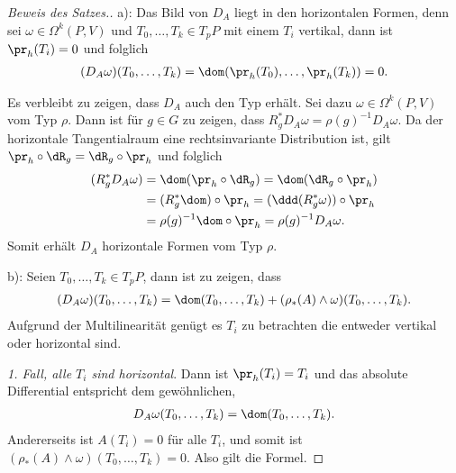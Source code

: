 \documentclass[%
	paper=a5,%
	fleqn,%
	DIV=18,%
	BCOR=0mm,
	fontsize=11pt,
	titlepage=false,%
	bibliography=totoc,
	DIV=18,%
	twoside=true,
	pdftitle=Riemannsche Geometrie,
	pdfauthor=Uwe Semmelmann,
	numbers=noendperiod]%
	{scrbook}
\begin{document}
\begin{proof}[Beweis des Satzes.]
a): Das Bild von $D_A$ liegt in den horizontalen Formen, denn sei
$\omega\in\Omega^k(P,V)$ und $T_0,\ldots,T_k\in T_pP$ mit einem $T_i$ vertikal,
dann ist $\pr_h(T_i) = 0$ und folglich
\begin{align*}
(D_A\omega)(T_0,\ldots,T_k) = \dom(\pr_h(T_0),\ldots,\pr_h(T_k)) = 0.
\end{align*}

Es verbleibt zu zeigen, dass $D_A$ auch den Typ erhält. Sei dazu
$\omega\in\Omega^k(P,V)$ vom Typ $\rho$. Dann ist für $g\in G$ zu
zeigen, dass $R_g^*D_A\omega = \rho(g)^{-1}D_A\omega$. Da der horizontale
Tangentialraum eine rechtsinvariante Distribution ist, gilt $\pr_h\circ \dR_g =
\dR_g\circ \pr_h$ und folglich
\begin{align*}
(R_g^* D_A \omega) &
= \dom(\pr_h\circ \dR_g)
= \dom(\dR_g\circ \pr_h)\\
&= (R_g^*\dom)\circ\pr_h
= (\ddd (R_g^*\omega))\circ\pr_h\\
&= \rho(g)^{-1} \dom\circ\pr_h
=\rho(g)^{-1} D_A\omega.
\end{align*}
Somit erhält $D_A$ horizontale Formen vom Typ $\rho$.

b): Seien $T_0,\ldots,T_k\in T_pP$, dann ist zu zeigen, dass
\begin{align*}
(D_A\omega)(T_0,\ldots,T_k) = 
\dom(T_0,\ldots,T_k) + (\rho_*(A)\wedge \omega)(T_0,\ldots,T_k).
\end{align*}
Aufgrund der Multilinearität genügt es $T_i$ zu betrachten die
entweder vertikal oder horizontal sind.

\textit{1. Fall, alle $T_i$ sind horizontal}. Dann ist $\pr_h(T_i) = T_i$ und
das absolute Differential entspricht dem gewöhnlichen,
\begin{align*}
D_A\omega(T_0,\ldots,T_k) = \dom(T_0,\ldots,T_k).
\end{align*}
Andererseits ist $A(T_i) = 0$ für alle $T_i$, und somit ist $(\rho_*(A)\wedge
\omega)(T_0,\ldots,T_k) = 0$. Also gilt die Formel.


\end{proof}
\end{document}
